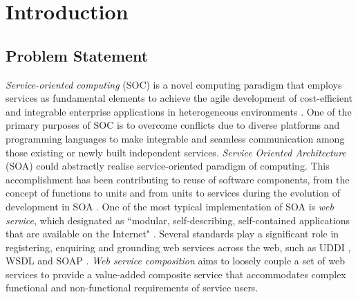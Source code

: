 \chapter{Introduction}\label{C:intro}

\section{Problem Statement}
\emph{Service-oriented computing} (SOC) is a novel computing paradigm that employs services as fundamental elements to achieve the agile development of cost-efficient and integrable enterprise applications in heterogeneous environments \cite{papazoglou2003service, papazoglou2006p}. One of the primary purposes of SOC is to overcome conflicts due to diverse platforms and programming languages to make integrable and seamless communication among those existing or newly built independent services. \emph{Service Oriented Architecture} (SOA)  could abstractly realise service-oriented paradigm of computing. This accomplishment has been contributing to reuse of software components, from the concept of functions to units and from units to services during the evolution of development in SOA \cite{booth2004web, overdick2007resource}. One of the most typical implementation of SOA is \emph{web service}, which designated as ``modular, self-describing, self-contained applications that are available on the Internet" \cite{curbera2001web}. Several standards play a significant role in registering, enquiring and grounding web services across the web, such as UDDI \cite{curbera2002unraveling}, WSDL \cite{lausen2007semantic} and SOAP \cite{fensel2011semantic}. \emph{Web service composition} aims to loosely couple a set of web services to provide a value-added composite service that accommodates complex functional and non-functional requirements of service users. 


